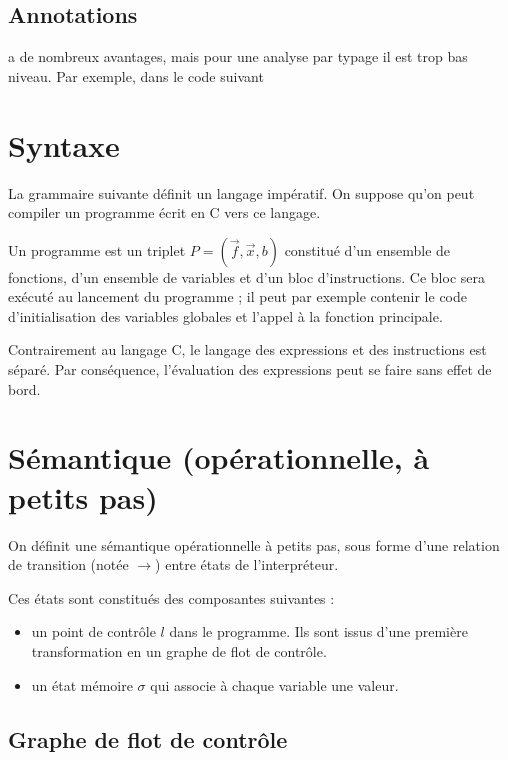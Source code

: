 \subsection{Annotations}

\newspeak{} a de nombreux avantages, mais pour une analyse par typage il est
trop bas niveau. Par exemple, dans le code suivant



\section{Syntaxe}

La grammaire suivante définit un langage impératif. On suppose qu'on peut
compiler un programme écrit en C vers ce langage.

Un programme est un triplet $P = (\vec{f}, \vec{x}, b)$ constitué d'un ensemble
de fonctions, d'un ensemble de variables et d'un bloc d'instructions. Ce bloc
sera exécuté au lancement du programme ; il peut par exemple contenir le code
d'initialisation des variables globales et l'appel à la fonction principale.




Contrairement au langage C, le langage des expressions et des instructions est
séparé. Par conséquence, l'évaluation des expressions peut se faire sans effet de
bord.

\section{Sémantique (opérationnelle, à petits pas)}

On définit une sémantique opérationnelle à petits pas, sous forme d'une relation
de transition (notée $→$) entre états de l'interpréteur.

Ces états sont constitués des composantes suivantes :

\begin{itemize}
\item
  un point de contrôle $l$ dans le programme. Ils sont issus d'une
  première transformation en un graphe de flot de contrôle.
\item
  un état mémoire $σ$ qui associe à chaque variable une valeur.
\end{itemize}

\subsection{Graphe de flot de contrôle}

